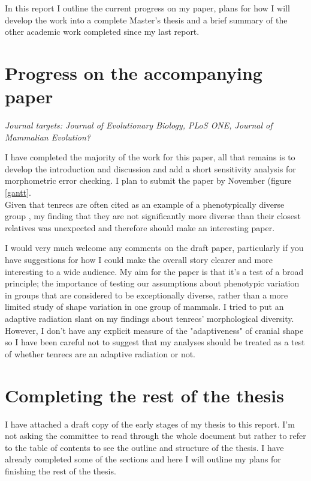 \documentclass[12pt,a4paper]{article}
\begin{document}
	In this report I outline the current progress on my paper, plans for how I will develop the work into a complete Master's thesis and a brief summary of the other academic work completed since my last report.  

\section{Progress on the accompanying paper}

	\textit{Journal targets: Journal of Evolutionary Biology, PLoS ONE, Journal of Mammalian Evolution?} 
\bigskip

	I have completed the majority of the work for this paper, all that remains is to develop the introduction and discussion and add a short sensitivity analysis for morphometric error checking. I plan to submit the paper by November (figure \ref{gantt}. \\
	Given that tenrecs are often cited as an example of a phenotypically diverse group \citep[e.g.][]{Olson2013}, my finding that they are not significantly more diverse than their closest relatives was unexpected and therefore should make an interesting paper.

	I would very much welcome any comments on the draft paper, particularly if you have suggestions for how I could make the overall story clearer and more interesting to a wide audience. My aim for the paper is that it's a test of a broad principle; the importance of testing our assumptions about phenotypic variation in groups that are considered to be exceptionally diverse, rather than a more limited study of shape variation in one group of mammals. I tried to put an adaptive radiation slant on my findings about tenrecs' morphological diversity. However, I don't have any explicit measure of the "adaptiveness" of cranial shape so I have been careful not to suggest that my analyses should be treated as a test of whether tenrecs are an adaptive radiation or not.




\section{Completing the rest of the thesis}

	I have attached a draft copy of the early stages of my thesis to this report. I'm not asking the committee to read through the whole document but rather to refer to the table of contents to see the outline and structure of the thesis. I have already completed some of the sections and here I will outline my plans for finishing the rest of the thesis.
\end{document}
